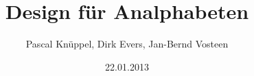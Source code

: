 \documentclass{beamer}
\begin{document}
    \author{Pascal Knüppel, Dirk Evers, Jan-Bernd Vosteen}
    \title{Design für Analphabeten}
    \date{22.01.2013}
    
    \frame{\titlepage}
    

	


	

\end{document}
